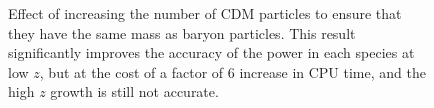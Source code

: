 \documentclass[]{article}
\begin{document}
\begin{figure}[h]
	\caption{Effect of increasing the number of CDM particles to ensure that they have the same mass as baryon particles. This result significantly improves the accuracy of the power in each species at low $z$, but at the cost of a factor of 6 increase in CPU time, and the high $z$ growth is still not accurate.}
\end{figure}

\clearpage
\end{document}
